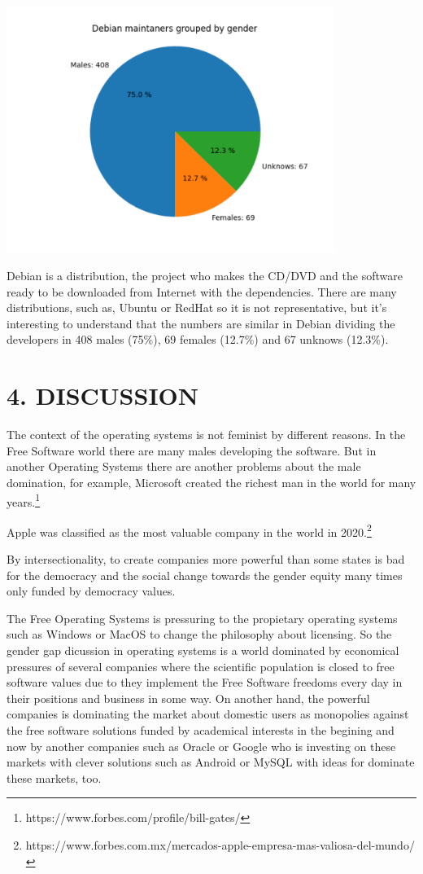 \documentclass[fleqn,10pt,lineno]{wlpeerj} %
\begin{document}
\includegraphics[width=0.8\textwidth]{images/debian-maintainers.gender.pdf}

Debian is a distribution, the project who makes the CD/DVD and the
software ready to be downloaded from Internet with the
dependencies. There are many distributions, such as, Ubuntu or RedHat
so it is not representative, but it's interesting to understand that
the numbers are similar in Debian dividing the developers in 408 males
(75\%), 69 females (12.7\%) and 67 unknows (12.3\%).


\section*{4. DISCUSSION}

The context of the operating systems is not feminist by different
reasons. In the Free Software world there are many males developing
the software. But in another Operating Systems there are another
problems about the male domination, for example, Microsoft created the
richest man in the world for many
years.\footnote{https://www.forbes.com/profile/bill-gates/}

Apple was classified as the most valuable company in the world in
2020.\footnote{https://www.forbes.com.mx/mercados-apple-empresa-mas-valiosa-del-mundo/}

By intersectionality, to create companies more powerful than some
states is bad for the democracy and the social change towards the
gender equity many times only funded by democracy values.

The Free Operating Systems is pressuring to the propietary operating
systems such as Windows or MacOS to change the philosophy about
licensing. So the gender gap dicussion in operating systems is a world
dominated by economical pressures of several companies where the
scientific population is closed to free software values due to they
implement the Free Software freedoms every day in their positions and
business in some way. On another hand, the powerful companies is
dominating the market about domestic users as monopolies against the
free software solutions funded by academical interests in the begining
and now by another companies such as Oracle or Google who is
investing on these markets with clever solutions such as Android or
MySQL with ideas for dominate these markets, too.
\end{document}
